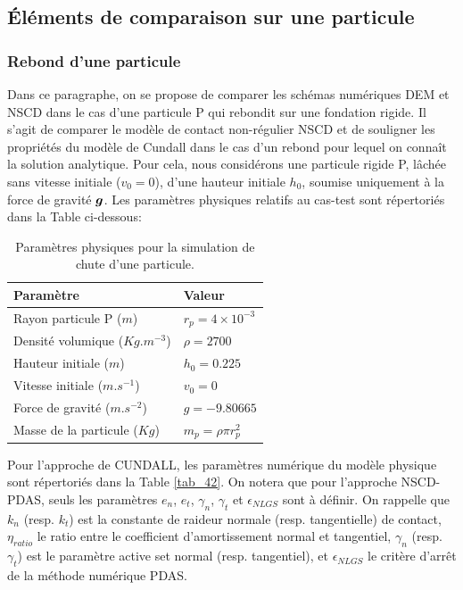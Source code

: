 \subsection{Éléments de comparaison sur une particule}

\subsubsection{Rebond d'une particule}

Dans ce paragraphe, on se propose de comparer les schémas numériques DEM et NSCD dans le cas d'une particule P qui rebondit sur une fondation rigide. Il s'agit de comparer le modèle de contact non-régulier NSCD et de souligner les propriétés du modèle de Cundall dans le cas d'un rebond pour lequel on connaît la solution analytique. Pour cela, nous considérons une particule rigide P, lâchée sans vitesse initiale ($v_0 = 0$), d'une hauteur initiale $h_0$, soumise uniquement à la force de gravité $\boldsymbol{g}$. Les paramètres physiques relatifs au cas-test sont répertoriés dans la Table ci-dessous:

\begin{center}
\begin{table}[!h]
\begin{tabular}{ |p{6.2cm}|p{6.2cm}| }
 \hline \rowcolor{lightgray}
 Paramètre& Valeur\\
 \hline
 Rayon particule P  ($m$) & $r_p = 4\times10^{-3}$\\
 Densité volumique ($Kg.m^{-3}$)& $\rho = 2700$\\
 Hauteur initiale ($m$) & $h_0 = 0.225$\\
 Vitesse initiale  ($m.s^{-1}$)  &$v_0 = 0$\\
 Force de gravité ($m.s^{-2}$)& $g = -9.80665$\\
 Masse de la particule ($Kg$)  &$m_p = \rho \pi r_p^{2}$\\
 \hline
\end{tabular}
\caption{Paramètres physiques pour la simulation de chute d'une particule.}\label{tab_41}
\end{table}
\end{center}
\vspace{-1cm}
\noindent Pour l'approche de CUNDALL, les paramètres numérique du modèle physique sont répertoriés dans la Table \ref{tab_42}. On notera que pour l'approche NSCD-PDAS, seuls les paramètres $e_n$, $e_t$, $\gamma_n$, $\gamma_t$ et $\epsilon_{NLGS}$ sont à définir. On rappelle que $k_n$ (resp. $k_t$) est la constante de raideur normale (resp. tangentielle) de contact, $\eta_{ratio}$ le ratio entre le coefficient d'amortissement normal et tangentiel, $\gamma_n$ (resp. $\gamma_t$) est le paramètre active set normal (resp. tangentiel), et $\epsilon_{NLGS}$ le critère d'arrêt de la méthode numérique PDAS.

